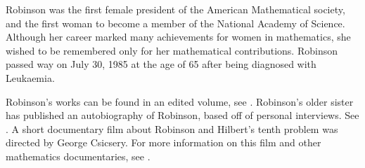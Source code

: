 \documentclass[../../../include/open-logic-section]{subfiles}
\begin{document}
Robinson was the first female president of the American Mathematical
society, and the first woman to become a member of the National Academy of
Science. Although her career marked many achievements for women in
mathematics, she wished to be remembered only for her mathematical
contributions. Robinson passed way on July 30, 1985 at the age of 65 after
being diagnosed with Leukaemia.


\begin{reading} Robinson's works can be found in an edited volume, see
\citet{Robinson1996}. Robinson's older sister has published an
autobiography of Robinson, based off of personal interviews. See
\citet{Reid1986}. A short documentary film about Robinson and Hilbert's
tenth problem was directed by George Csicsery. For more information on this
film and other mathematics documentaries, see \citet{Csicsery2016}.
\end{reading}
\end{document}
